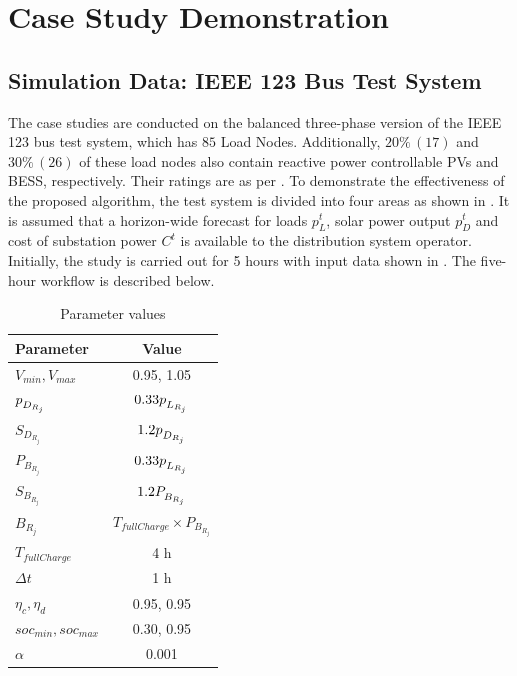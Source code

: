 \documentclass[../../outputs/main.tex]{subfiles}
\begin{document}
\section{Case Study Demonstration}

\subsection{Simulation Data: IEEE 123 Bus Test System}
The case studies are conducted on the balanced three-phase version of the IEEE 123 bus test system, which has $85$ Load Nodes. Additionally, $20 \% \, (17)$ and $30 \% \, (26)$ of these load nodes also contain reactive power controllable PVs and BESS, respectively. Their ratings are as per . To demonstrate the effectiveness of the proposed algorithm, the test system is divided into four areas as shown in . It is assumed that a horizon-wide forecast for loads $p^t_L$, solar power output $p^t_D$ and cost of substation power  $C^t$ is available to the distribution system operator. Initially, the study is carried out for 5 hours with input data shown in . The five-hour workflow is described below. 

\def\ds{\rule{0pt}{1.5ex}} %

\begin{table}[t]
    \centering
    \caption{Parameter values}
    \begin{tabular}{|l|c|}
    \hline
    \textbf{Parameter} & \textbf{Value} \\ \hline
    $V_{min}, V_{max}$ & 0.95, 1.05 \\ \hline
    $p_{\ds D_{R_j}}$ & $0.33 p_{\ds L_{R_j}}$ \\ \hline
    $S_{D_{R_j}}$ & $1.2 p_{\ds D_{R_j}}$ \\ \hline
    $P_{B_{R_j}}$ & $0.33 p_{\ds L_{R_j}}$ \\ \hline
    $S_{B_{R_j}}$ & $1.2 P_{\ds B_{R_j}}$ \\ \hline
    $B_{R_j}$ & $T_{fullCharge} \times P_{B_{R_j}}$ \\ \hline
    $T_{fullCharge}$ & 4 h \\ \hline
    $\Delta t$ & 1 h \\ \hline
    $\eta_c, \eta_d$ & 0.95, 0.95 \\ \hline
    $soc_{min}, soc_{max}$ & 0.30, 0.95 \\ \hline
    $\alpha$ & 0.001 \\ \hline
    \end{tabular}
    \label{table:parameter-values}
\end{table}
\end{document}
